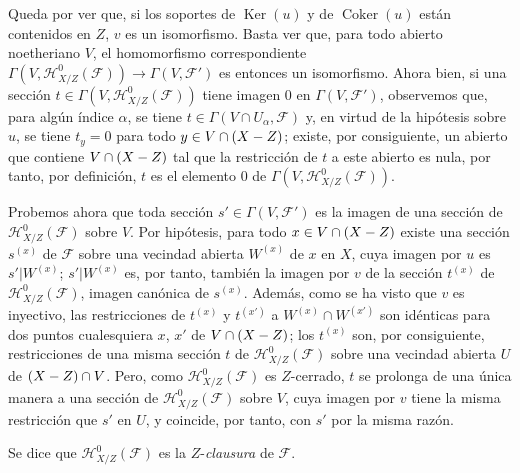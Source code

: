 Queda por ver que, si los soportes de $\operatorname{Ker}(u)$ y de
$\operatorname{Coker}(u)$ están contenidos en $Z$, $v$ es un isomorfismo.
Basta ver que, para todo abierto noetheriano $V$, el homomorfismo
correspondiente
$\Gamma(V,\mathcal H^0_{X/Z}(\mathcal F))
\longrightarrow\Gamma(V,\mathcal F')$
es entonces un isomorfismo. Ahora bien, si una sección
$t\in\Gamma(V,\mathcal H^0_{X/Z}(\mathcal F))$ tiene imagen $0$ en
$\Gamma(V,\mathcal F')$, observemos que, para algún índice $\alpha$, se tiene
$t\in\Gamma(V\cap U_\alpha,\mathcal F)$ y, en virtud de la hipótesis sobre
$u$, se tiene $t_y=0$ para todo $y\in V\cap(X- Z)$; existe, por consiguiente,
un abierto que contiene $V\cap(X- Z)$ tal que la restricción de $t$ a este
abierto es nula, por tanto, por definición, $t$ es el elemento $0$ de
$\Gamma(V,\mathcal H^0_{X/Z}(\mathcal F))$.

Probemos ahora que toda sección $s'\in\Gamma(V,\mathcal F')$ es la imagen de
una sección de $\mathcal H^0_{X/Z}(\mathcal F)$ sobre $V$. Por hipótesis,
para todo $x\in V\cap(X- Z)$ existe una sección $s^{(x)}$ de $\mathcal F$
sobre una vecindad abierta $W^{(x)}$ de $x$ en $X$, cuya imagen por $u$ es
$s'|W^{(x)}$; $s'|W^{(x)}$ es, por tanto, también la imagen por $v$ de la
sección $t^{(x)}$ de $\mathcal H^0_{X/Z}(\mathcal F)$, imagen canónica de
$s^{(x)}$. Además, como se ha visto que $v$ es inyectivo, las restricciones
de $t^{(x)}$ y $t^{(x')}$ a $W^{(x)}\cap W^{(x')}$ son idénticas para dos
puntos cualesquiera $x$, $x'$ de $V\cap(X- Z)$; los $t^{(x)}$ son, por
consiguiente, restricciones de una misma sección $t$ de
$\mathcal H^0_{X/Z}(\mathcal F)$ sobre una vecindad abierta $U$ de
$(X- Z)\cap V$. Pero, como $\mathcal H^0_{X/Z}(\mathcal F)$ es $Z$-cerrado,
$t$ se prolonga de una única manera a una sección de
$\mathcal H^0_{X/Z}(\mathcal F)$ sobre $V$, cuya imagen por $v$ tiene la
misma restricción que $s'$ en $U$, y coincide, por tanto, con $s'$ por la misma
razón.

Se dice que $\mathcal H^0_{X/Z}(\mathcal F)$ es la $Z$-\emph{clausura} de
$\mathcal F$.

